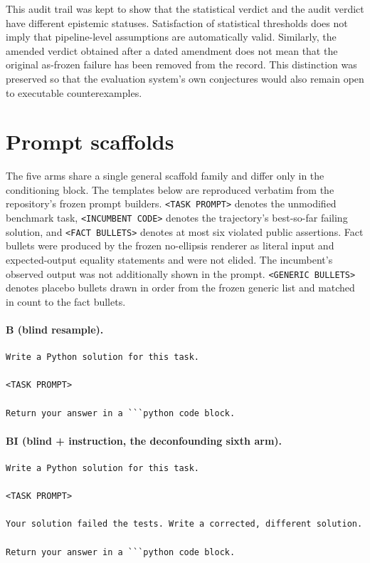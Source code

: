 \documentclass{article}
\numberwithin{equation}{section}  %
\theoremstyle{definition}
\newcommand{\armB}{\textsf{B}}
\newcommand{\armBI}{\textsf{BI}}
\begin{document}
This audit trail was kept to show that the statistical verdict and the audit verdict have
different epistemic statuses. Satisfaction of statistical thresholds does not imply that
pipeline-level assumptions are automatically valid. Similarly, the amended verdict obtained
after a dated amendment does not mean that the original as-frozen failure has been removed
from the record. This distinction was preserved so that the evaluation system's own
conjectures would also remain open to executable counterexamples.

\section{Prompt scaffolds}
\label{app:prompts}

The five arms share a single general scaffold family and differ only in the conditioning
block. The templates below are reproduced verbatim from the repository's frozen prompt
builders. \texttt{<TASK PROMPT>} denotes the unmodified benchmark task,
\texttt{<INCUMBENT CODE>} denotes the trajectory's best-so-far failing solution, and
\texttt{<FACT BULLETS>} denotes at most six violated public assertions. Fact bullets were
produced by the frozen no-ellipsis renderer as literal input and expected-output equality
statements and were not elided. The incumbent's observed output was not additionally shown in
the prompt. \texttt{<GENERIC BULLETS>} denotes placebo bullets drawn in order from the frozen
generic list and matched in count to the fact bullets.

\paragraph{\armB{} (blind resample).}
{\small\begin{verbatim}
Write a Python solution for this task.

<TASK PROMPT>

Return your answer in a ```python code block.
\end{verbatim}}

\paragraph{\armBI{} (blind + instruction, the deconfounding sixth arm).}
{\small\begin{verbatim}
Write a Python solution for this task.

<TASK PROMPT>

Your solution failed the tests. Write a corrected, different solution.

Return your answer in a ```python code block.
\end{verbatim}}
\end{document}
